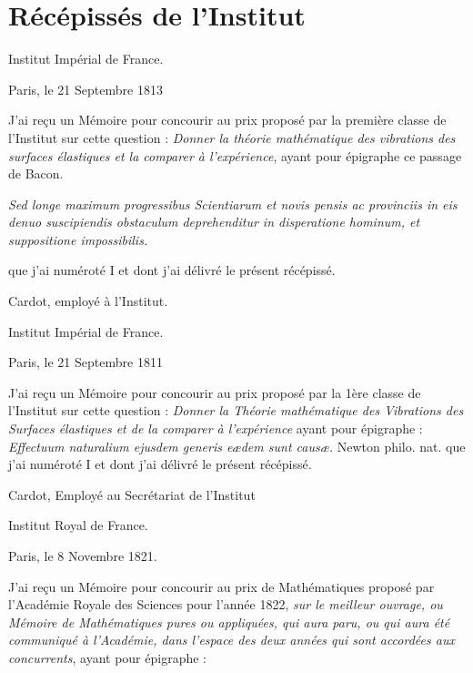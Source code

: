 \documentclass[11pt,a4paper]{article}
\begin{document}
\section{Récépissés de l'Institut}


Institut Impérial de France.

Paris, le 21 Septembre 1813

J'ai reçu un Mémoire pour concourir au prix proposé par la première classe de l'Institut sur cette question : \emph{Donner la théorie mathématique des vibrations des surfaces élastiques et la comparer à l'expérience}, ayant pour épigraphe ce passage de Bacon.

\emph{Sed longe maximum progressibus Scientiarum et novis pensis ac provinciis in eis denuo suscipiendis obstaculum deprehenditur in disperatione hominum, et suppositione impossibilis.}

que j'ai numéroté I et dont j'ai délivré le présent récépissé.

Cardot, employé à l'Institut.


Institut Impérial de France.

Paris, le 21 Septembre 1811

J'ai reçu un Mémoire pour concourir au prix proposé par la 1ère classe de l'Institut sur cette question : \emph{Donner la Théorie mathématique des Vibrations des Surfaces élastiques et de la comparer à l'expérience} ayant pour épigraphe : \emph{Effectuum naturalium ejusdem generis eædem sunt causæ.} Newton philo. nat. que j'ai numéroté I et dont j'ai délivré le présent récépissé.

Cardot, Employé au Secrétariat de l'Institut


Institut Royal de France.

Paris, le 8 Novembre 1821.

J'ai reçu un Mémoire pour concourir au prix de Mathématiques proposé par l'Académie Royale des Sciences pour l'année 1822, \emph{sur le meilleur ouvrage, ou Mémoire de Mathématiques pures ou appliquées, qui aura paru, ou qui aura été communiqué à l'Académie, dans l'espace des deux années qui sont accordées aux concurrents}, ayant pour épigraphe :
\end{document}
